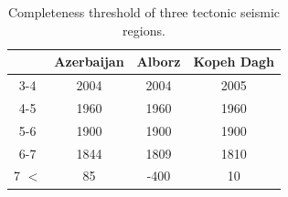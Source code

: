 \begin{table}[h]
\centering
\caption{Completeness threshold of three tectonic seismic regions.}
\begin{tabular}{cccc}
 ~           & Azerbaijan & Alborz & Kopeh Dagh \\ \hline
3-4         & 2004       & 2004   & 2005       \\ \hline
4-5         & 1960       & 1960   & 1960       \\ \hline
5-6         & 1900       & 1900   & 1900       \\ \hline
6-7         & 1844       & 1809   & 1810         \\ \hline
7 $< $    &  85          & -400    & 10         \\ \hline
\end{tabular}
\end{table}
